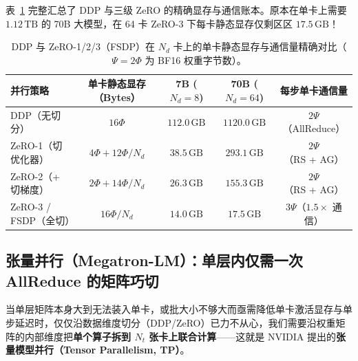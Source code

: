 表~\ref{tab:zero-ledger} 完整汇总了 DDP 与三级 ZeRO 的精确显存与通信账本。原本在单卡上需要 $1.12\,\mathrm{TB}$ 的 70B 大模型，在 64 卡 ZeRO-3 下每卡静态显存仅剩区区 $17.5\,\mathrm{GB}$！

\begin{table}[htbp]
\centering
\caption{DDP 与 ZeRO-1/2/3（FSDP）在 $N_d$ 卡上的单卡静态显存与通信量精确对比（$\Psi = 2\Phi$ 为 BF16 权重字节数）。}
\label{tab:zero-ledger}
\small
\begin{tabular}{@{}lcccc@{}}
\toprule
\textbf{并行策略} & \textbf{单卡静态显存（Bytes）} & \textbf{7B ($N_d=8$)} & \textbf{70B ($N_d=64$)} & \textbf{每步单卡通信量} \\
\midrule
DDP（无切分） & $16\Phi$ & $112.0\,\mathrm{GB}$ & $1120.0\,\mathrm{GB}$ & $2\Psi$（AllReduce） \\
ZeRO-1（切优化器） & $4\Phi + 12\Phi / N_d$ & $38.5\,\mathrm{GB}$ & $293.1\,\mathrm{GB}$ & $2\Psi$（RS + AG） \\
ZeRO-2（+ 切梯度） & $2\Phi + 14\Phi / N_d$ & $26.3\,\mathrm{GB}$ & $155.3\,\mathrm{GB}$ & $2\Psi$（RS + AG） \\
ZeRO-3 / FSDP（全切） & $16\Phi / N_d$ & $\mathbf{14.0\,\mathrm{GB}}$ & $\mathbf{17.5\,\mathrm{GB}}$ & $3\Psi$（$1.5\times$ 通信） \\
\bottomrule
\end{tabular}
\end{table}

\subsection{张量并行（Megatron-LM）：单层内仅需一次 AllReduce 的矩阵巧切}
\label{subsec:tensor-parallel}

当单层矩阵本身大到无法装入单卡，或批大小不够大而亟需降低单卡激活显存与单步延迟时，仅仅沿数据维度切分（DDP/ZeRO）已力不从心，我们需要沿权重矩阵的内部维度把\textbf{单个算子拆到 $N_t$ 张卡上联合计算}——这就是 NVIDIA 提出的\textbf{张量模型并行（Tensor Parallelism, TP）}。

